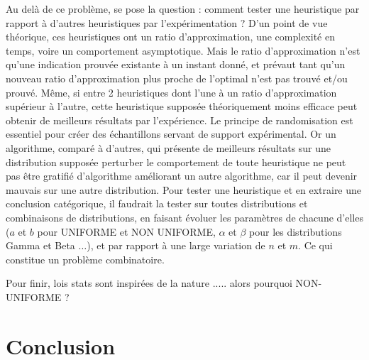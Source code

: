 \documentclass[a4paper,12pt]{report}
\theoremstyle{plain}				%
\theoremstyle{definition}				%
\begin{document}
Au delà de ce problème, se pose la question : comment tester une heuristique par rapport à d'autres heuristiques par l'expérimentation ?
D'un point de vue théorique, ces heuristiques ont un ratio d'approximation, 
  une complexité en temps, voire un comportement asymptotique. 
Mais le ratio d’approximation n’est qu'une indication prouvée existante 
  à un instant donné, et prévaut tant qu'un nouveau ratio d'approximation 
  plus proche de l'optimal n'est pas trouvé et/ou prouvé. 
Même, si entre 2 heuristiques dont l'une à un ratio d'approximation 
  supérieur à l'autre, cette heuristique supposée théoriquement moins 
  efficace peut obtenir de meilleurs résultats par l'expérience.      
Le principe de randomisation est essentiel pour créer des échantillons servant 
  de support expérimental. 
Or un algorithme, comparé à d'autres, qui présente de meilleurs résultats 
  sur une distribution supposée perturber le comportement de toute heuristique 
  ne peut pas être gratifié d'algorithme améliorant un autre algorithme, 
  car il peut devenir mauvais sur une autre distribution. 
Pour tester une heuristique et en extraire une conclusion catégorique, 
  il faudrait la tester sur toutes distributions et combinaisons 
  de distributions, en faisant évoluer les paramètres de chacune d'elles 
 ($a$ et $b$ pour UNIFORME et NON UNIFORME, $\alpha$ et $\beta$ 
  pour les distributions Gamma et Beta $\ldots$), 
  et par rapport à une large variation de $n$ et $m$.  
Ce qui constitue un problème combinatoire.

Pour finir, lois stats sont inspirées de la nature  ..... alors pourquoi NON-UNIFORME ?

\section{Conclusion} \label{sec:conclusion}
\end{document}

